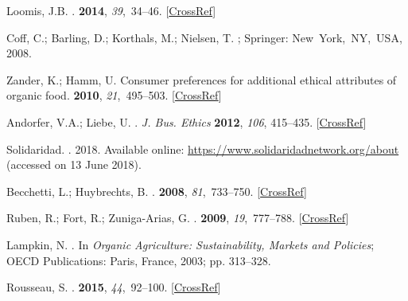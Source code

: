 \documentclass[sustainability,article,accept,moreauthors,pdftex,10pt,a4paper]{Definitions/mdpi}
\theoremstyle{mdpi}
\newcounter{ex}
\newcounter{re}
\theoremstyle{mdpidefinition}
\begin{document}
{\begin{thebibliography}{999}
Loomis, J.B.
.
 {\bf 2014}, {\em
39},~34--46. [\href{http://dx.doi.org/10.1111/j.1467-6419.2010.00675.x}{CrossRef}]

Coff, C.; Barling, D.; Korthals, M.; Nielsen, T.
; Springer: \mbox{New York, NY, USA}, 2008.

Zander, K.; Hamm, U.
\newblock Consumer preferences for additional ethical attributes of organic
food.
 {\bf 2010}, {\em 21},~495--503. [\href{http://dx.doi.org/10.1016/j.foodqual.2010.01.006}{CrossRef}]

Andorfer, V.A.; Liebe, U.
. \emph{J. Bus. Ethics } \textbf{2012}, \emph{106}, 415--435. [\href{http://dx.doi.org/10.1007/s10551-011-1008-5}{CrossRef}]

Solidaridad.
. 2018.
\newblock Available online: \url{https://www.solidaridadnetwork.org/about} (accessed on 13 June 2018).   %

Becchetti, L.; Huybrechts, B.
.
 {\bf 2008}, {\em 81},~733--750. [\href{http://dx.doi.org/10.1007/s10551-007-9544-8}{CrossRef}]

Ruben, R.; Fort, R.; Zuniga-Arias, G.
.
 {\bf 2009}, {\em 19},~777--788. [\href{http://dx.doi.org/10.1080/09614520903027049}{CrossRef}]

Lampkin, N.
. In {\em Organic Agriculture: Sustainability, Markets and Policies};
OECD Publications: Paris, France, 2003; pp. 313--328.

Rousseau, S.
.
 {\bf 2015}, {\em 44},~92--100. [\href{http://dx.doi.org/10.1016/j.foodqual.2015.04.002}{CrossRef}]


\end{thebibliography}}
\end{document}
